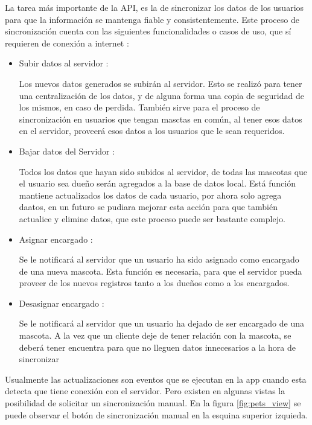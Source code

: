 La tarea más importante de la API, es la de sincronizar los datos de los usuarios para que la información se mantenga fiable y consistentemente. Este proceso de sincronización cuenta con las siguientes funcionalidades o casos de uso, que sí requieren de conexión a internet :
\begin{itemize}
	\item Subir datos al servidor :
	
	Los nuevos datos generados se subirán al servidor. Esto se realizó para tener una centralización de los datos, y de alguna forma una copia de seguridad de los mismos, en caso de perdida. También sirve para el proceso de sincronización en usuarios que tengan masctas en común, al tener esos datos en el servidor, proveerá esos datos a los usuarios que le sean requeridos.
	
	\item Bajar datos del Servidor :
	
	Todos los datos que hayan sido subidos al servidor, de todas las mascotas que el usuario sea dueño serán agregados a la base de datos local. Está función mantiene actualizados los datos de cada usuario, por ahora solo agrega daatos, en un futuro se pudiara mejorar esta acción para que también actualice y elimine datos, que este proceso puede ser bastante complejo. 
	
	\item Asignar encargado :
	
	Se le notificará al servidor que un usuario ha sido asignado como encargado de una nueva mascota. Esta función es necesaria, para que el servidor pueda proveer de los nuevos registros tanto a los dueños como a los encargados.
	
		\item Desasignar encargado :
	
	Se le notificará al servidor que un usuario ha dejado de ser  encargado de una mascota. A la vez que un cliente deje de tener relación con la mascota, se deberá tener encuentra para que no lleguen datos innecesarios a la hora de sincronizar   
\end{itemize}
Usualmente las actualizaciones son eventos que se ejecutan en la app cuando esta detecta que tiene conexión con el servidor. Pero existen en algunas vistas la posibilidad de solicitar un sincronización manual. En la figura \ref{fig:pets_view} se puede observar el botón de sincronización manual en la esquina superior izquieda.
